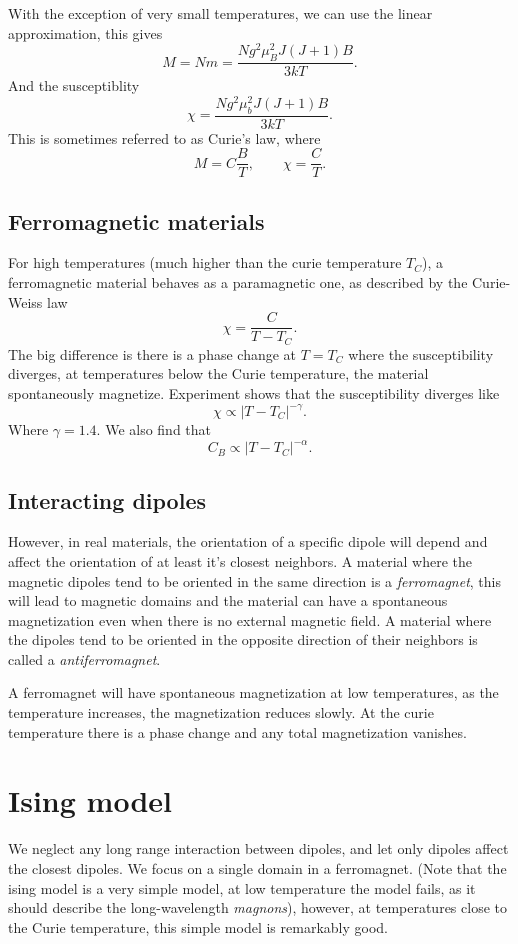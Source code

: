 \documentclass[a4paper, 11pt, notitlepage, english]{article}
\begin{document}
With the exception of very small temperatures, we can use the linear approximation, this gives
$$M = Nm = \frac{Ng^2\mu_B^2J(J+1)B}{3kT}.$$
And the susceptiblity
$$\chi = \frac{Ng^2\mu_b^2J(J+1)B}{3kT}.$$
This is sometimes referred to as Curie's law, where 
$$M = C \frac{B}{T}, \qquad \chi = \frac{C}{T}.$$

\subsection*{Ferromagnetic materials}
For high temperatures (much higher than the curie temperature $T_C$), a ferromagnetic material behaves as a paramagnetic one, as described by the Curie-Weiss law
$$\chi = \frac{C}{T-T_C}.$$
The big difference is there is a phase change at $T = T_C$ where the susceptibility diverges, at temperatures below the Curie temperature, the material spontaneously magnetize. Experiment shows that the susceptibility diverges like
$$\chi \propto |T-T_C|^{-\gamma}.$$
Where $\gamma = 1.4$. We also find that
$$C_B \propto |T-T_C|^{-\alpha}.$$



\subsection*{Interacting dipoles}

However, in real materials, the orientation of a specific dipole will depend and affect the orientation of at least it's closest neighbors. A material where the magnetic dipoles tend to be oriented in the same direction is a \emph{ferromagnet}, this will lead to magnetic domains and the material can have a spontaneous magnetization even when there is no external magnetic field. A material where the dipoles tend to be oriented in the opposite direction of their neighbors is called a \emph{antiferromagnet}.

A ferromagnet will have spontaneous magnetization at low temperatures, as the temperature increases, the magnetization reduces slowly. At the curie temperature there is a phase change and any total magnetization vanishes.

\clearpage

\section*{Ising model}

We neglect any long range interaction between dipoles, and let only dipoles affect the closest dipoles. We focus on a single domain in a ferromagnet. (Note that the ising model is a very simple model, at low temperature the model fails, as it should describe the long-wavelength \emph{magnons}), however, at temperatures close to the Curie temperature, this simple model is remarkably good.
\end{document}

